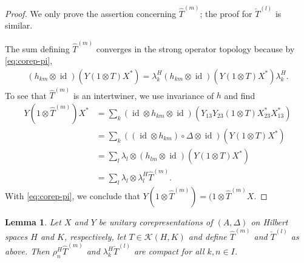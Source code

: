 \documentclass[11pt]{article}
\DeclareMathOperator{\id}{id}
\newtheorem{Lem}[Theorem]{Lemma}
\theoremstyle{definition}
\numberwithin{equation}{section}
\begin{document}
\begin{proof}
  We only prove the assertion concerning $\hat T^{(m)}$; the proof for $\check T^{(l)}$ is similar.
  
The sum defining $\hat T^{(m)}$ converges in the strong operator
topology because  by \eqref{eq:corep-pi},
  \begin{align*}
    (h_{km} \otimes \id)(Y(1 \otimes T)X^{*}) = \lambda^{H}_{k}
    (h_{km} \otimes \id)(Y(1 \otimes T)X^{*}) \lambda^{H}_{k}.
  \end{align*}
  To see that $\hat T^{(m)}$ is an intertwiner, we use invariance of
  $h$ and find
  \begin{align*}
    Y(1 \otimes \hat T^{(m)})X^{*} &=
    \sum_{k} (\id \otimes h_{km} \otimes \id)(Y_{13}Y_{23}(1 \otimes T)X^{*}_{23}X^{*}_{13}) \\
    &= \sum_{k} ((\id \otimes h_{km})\circ \Delta \otimes \id)(Y(1 \otimes T)X^{*}) \\
    &=\sum_{l} \lambda_{l} \otimes (h_{lm} \otimes \id)(Y(1\otimes T)X^{*}) \\
    &= \sum_{l} \lambda_{l}   \otimes \lambda^{H}_{l} \hat T^{(m)}.
  \end{align*}
  With \eqref{eq:corep-pi}, we conclude that $Y(1\otimes \hat T^{(m)})
  = (1 \otimes \hat T^{(m)}X$.
\end{proof} 
\begin{Lem} \label{lem:intertwiner-compact}
  Let $X$ and $Y$ be unitary corepresentations of $(A,\Delta)$ on Hilbert spaces $H$ and $K$,
  respectively,  let $T \in \mathcal{K}(H,K)$ and define $\hat
  T^{(m)}$ and $\check T^{(l)}$ as above. Then
$\rho^{H}_{n}\hat T^{(m)}$ and $\lambda^{H}_{k}\check T^{(l)}$ are compact for all $k,n\in I$.
\end{Lem}
\end{document}
